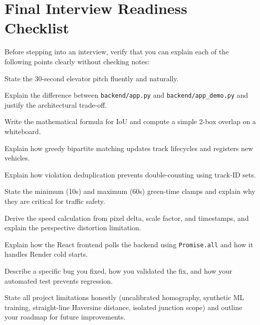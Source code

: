 \documentclass[11pt,a4paper,oneside]{report}
\begin{document}
\section{Final Interview Readiness Checklist}
\label{sec:glossary_checklist}

Before stepping into an interview, verify that you can explain each of the following points clearly without checking notes:

\begin{checklist}
    \item State the 30-second elevator pitch fluently and naturally.
    \item Explain the difference between \texttt{backend/app.py} and \texttt{backend/app\_demo.py} and justify the architectural trade-off.
    \item Write the mathematical formula for IoU and compute a simple 2-box overlap on a whiteboard.
    \item Explain how greedy bipartite matching updates track lifecycles and registers new vehicles.
    \item Explain how violation deduplication prevents double-counting using track-ID sets.
    \item State the minimum (10s) and maximum (60s) green-time clamps and explain why they are critical for traffic safety.
    \item Derive the speed calculation from pixel delta, scale factor, and timestamps, and explain the perspective distortion limitation.
    \item Explain how the React frontend polls the backend using \texttt{Promise.all} and how it handles Render cold starts.
    \item Describe a specific bug you fixed, how you validated the fix, and how your automated test prevents regression.
    \item State all project limitations honestly (uncalibrated homography, synthetic ML training, straight-line Haversine distance, isolated junction scope) and outline your roadmap for future improvements.
\end{checklist}

\end{document}
